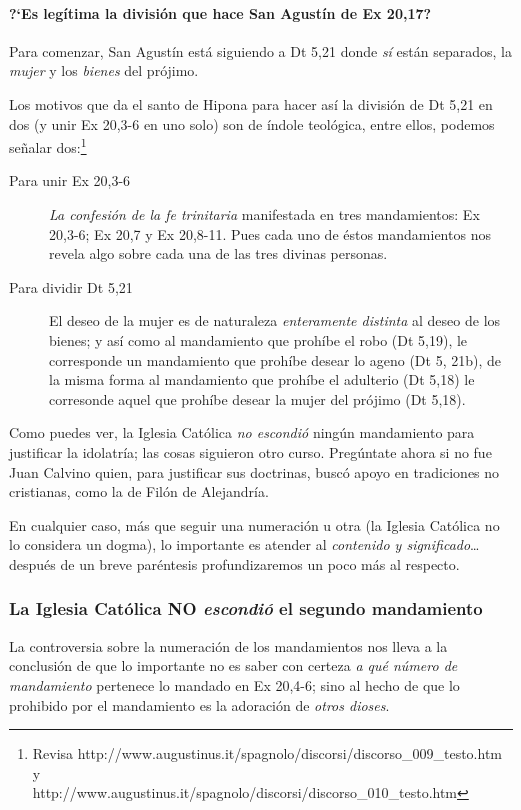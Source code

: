 \documentclass{article}
\begin{document}
\paragraph{?`Es leg\'{i}tima la divisi\'on que hace San Agust\'{i}n de Ex 20,17?}

Para comenzar, San Agust\'{i}n est\'a siguiendo a Dt 5,21 donde \emph{s\'{i}} est\'an separados, la \emph{mujer} y los \emph{bienes} del pr\'ojimo.

Los motivos que da el santo de Hipona para hacer as\'{i} la divisi\'on de Dt 5,21 en dos (y unir Ex 20,3-6 en uno solo) son de \'{i}ndole teol\'ogica, entre ellos, podemos se\~nalar dos:\footnote{Revisa http://www.augustinus.it/spagnolo/discorsi/discorso\_009\_testo.htm y \\ http://www.augustinus.it/spagnolo/discorsi/discorso\_010\_testo.htm}

\begin{description}
\item[Para unir Ex 20,3-6] \emph{La confesi\'on de la fe trinitaria} manifestada en tres mandamientos: Ex 20,3-6; Ex 20,7 y Ex 20,8-11. Pues cada uno de \'estos mandamientos nos revela algo sobre cada una de las tres divinas personas.
\item[Para dividir Dt 5,21] El deseo de la mujer es de naturaleza \emph{enteramente distinta} al deseo de los bienes; y as\'i como al mandamiento que proh\'{i}be el robo (Dt 5,19), le corresponde un mandamiento que proh\'{i}be desear lo ageno (Dt 5, 21b), de la misma forma al mandamiento que proh\'{i}be el adulterio (Dt 5,18) le corresonde aquel que proh\'{i}be desear la mujer del pr\'ojimo (Dt 5,18).
\end{description}

\noindent
Como puedes ver, la Iglesia Cat\'olica \emph{no escondi\'o} ning\'un mandamiento para justificar la idolatr\'{i}a; las cosas siguieron otro curso. Preg\'untate ahora si no fue Juan Calvino quien, para justificar sus doctrinas, busc\'o apoyo en tradiciones no cristianas, como la de Fil\'on de Alejandr\'{i}a.

En cualquier caso, m\'as que seguir una numeraci\'on u otra (la Iglesia Cat\'olica no lo considera un dogma), lo importante es atender al \emph{contenido y significado}\ldots despu\'es de un breve par\'entesis profundizaremos un poco m\'as al respecto.

\subsubsection{La Iglesia Cat\'olica NO \emph{escondi\'o} el segundo mandamiento}
La controversia sobre la numeraci\'on de los mandamientos nos lleva a la conclusi\'on de que lo importante no es saber con certeza \emph{a qu\'e n\'umero de mandamiento} pertenece lo mandado en Ex 20,4-6; sino al hecho de que lo prohibido por el mandamiento es la adoraci\'on de \emph{otros dioses}.
\end{document}

